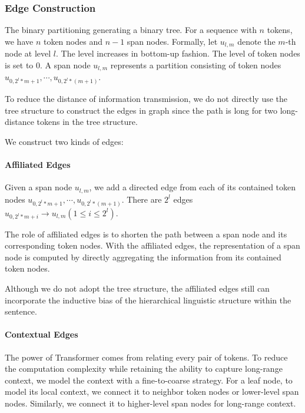 \documentclass[11pt,a4paper]{article}
\begin{document}
\subsubsection{Edge Construction}

The binary partitioning generating a binary tree. For a sequence with $n$ tokens, we have $n$ token nodes and $n-1$ span nodes. Formally, let $u_{l,m}$ denote the $m$-th node at level $l$. The level increases in bottom-up fashion. The level of token nodes is set to $0$.
A span node $u_{l,m}$ represents a partition consisting of token nodes $u_{0,2^{l}*m+1},\cdots,u_{0,2^{l}*(m+1)}$.

To reduce the distance of information transmission, we do not directly use the tree structure to construct the edges in graph since the path is long for two long-distance tokens in the tree structure.



We construct two kinds of edges:

\paragraph{Affiliated Edges}

Given a span node $u_{l,m}$, we add a directed edge from each of its contained token nodes $u_{0,2^{l}*m+1},\cdots,u_{0,2^{l}*(m+1)}$. There are $2^{l}$ edges $u_{0,2^{l}*m+i} \rightarrow u_{l,m} (1\leq i\leq 2^l)$.


The role of affiliated edges is to shorten the path between a span node and its corresponding token nodes.
With the affiliated edges, the representation of a span node is computed by directly aggregating the information from its contained token nodes.


Although we do not adopt the tree structure, the affiliated edges still can incorporate the inductive bias of the hierarchical linguistic structure within the sentence.


\paragraph{Contextual Edges}

The power of Transformer comes from relating every pair of tokens. To reduce the computation complexity while retaining the ability to capture long-range context, we model the context with a fine-to-coarse strategy. For a leaf node, to model its local context, we connect it to neighbor token nodes or lower-level span nodes. Similarly, we connect it to higher-level span nodes for long-range context.
\end{document}
